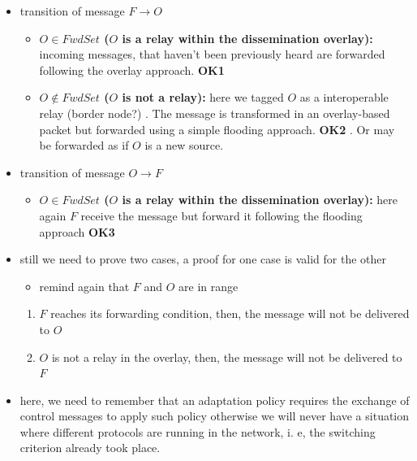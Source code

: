 \begin{itemize}
	\begin{itemize}
		\item overlay-based techniques tagged $O$ as a node being part or not of the forwarding set \textit{FwdSet}
		\item $F$ forwards incoming messages iif its forwarding condition isn't reached yet
	\end{itemize}
	\item transition of message $F \rightarrow O$
	\begin{itemize}
		\item \textbf{$O \in FwdSet$ ($O$ is a relay within the dissemination overlay):}  incoming messages, that haven't been previously heard are forwarded following the overlay approach. \textbf{OK1}
		\item \textbf{$O \notin FwdSet$ ($O$ is not a relay):} here we tagged $O$ as a interoperable relay (border node?) . The message is transformed in an overlay-based packet but forwarded using a simple flooding approach. \textbf{OK2} . Or may be forwarded as if $O$ is a new source.  
	\end{itemize}
	\item transition of message $O \rightarrow F$
	\begin{itemize}
		\item \textbf{$O \in FwdSet$ ($O$ is a relay within the dissemination overlay):} here again $F$ receive the message but forward it following the flooding approach \textbf{OK3}
	\end{itemize}
	\item still we need to prove two cases, a proof for one case is valid for the other
		\begin{itemize}
			\item remind again that $F$ and $O$ are in range 
		\end{itemize}
		\begin{enumerate}
			\item $F$ reaches its forwarding condition, then, the message will not be delivered to $O$
			\item $O$ is not a relay in the overlay, then, the message will not be delivered to $F$
		\end{enumerate}
	\item here, we need to remember that an adaptation policy requires the exchange of control messages to apply such policy otherwise we will never have a situation where different protocols are running in the network, i. e, the switching criterion already took place. 

\end{itemize}
